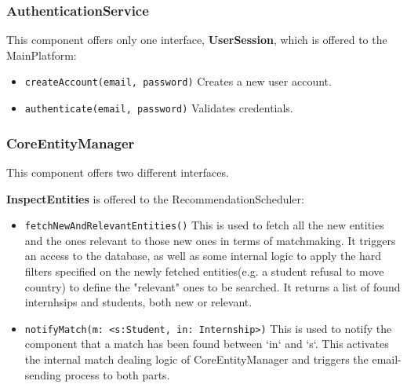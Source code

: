 \subsubsection{AuthenticationService}

This component offers only one interface, \textbf{UserSession}, which is offered to the MainPlatform:
\begin{itemize}
    \item \texttt{createAccount(email, password)} Creates a new user account.
    \item \texttt{authenticate(email, password)} Validates credentials.
\end{itemize}



\subsubsection{CoreEntityManager}
This component offers two different interfaces.

\textbf{InspectEntities} is offered to the RecommendationScheduler:
\begin{itemize}
    \item \texttt{fetchNewAndRelevantEntities()}
    This is used to fetch all the new entities and the ones relevant to those new ones in terms of matchmaking. It triggers an access to the database, as well as some internal logic to apply the hard filters specified on the newly fetched entities(e.g. a student refusal to move country) to define the "relevant" ones to be searched. It returns a list of found internhsips and students, both new or relevant.
    \item \texttt{notifyMatch(m: <s:Student, in: Internship>)}
    This is used to notify the component that a match has been found between `in` and `s`. This activates the internal match dealing logic of CoreEntityManager and triggers the email-sending process to both parts.
\end{itemize}

